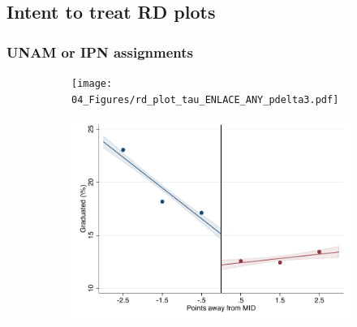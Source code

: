 \documentclass[oneside,11pt]{article}
\begin{document}
\subsection{Intent to treat RD plots}

\subsubsection{UNAM or IPN assignments}

\begin{figure}[H]

    \caption{RD plots for outcome variables across those assigned to either UNAM or IPN high-school, and those who are not\label{fig:ITT_rd_plot_elite_1}}
    \begin{center}
    
    \begin{subfigure}{0.475\textwidth}
        \centering
        \texttt{[image: 04\_Figures/rd\_plot\_tau\_ENLACE\_ANY\_pdelta3.pdf]}
    \end{subfigure}
    \begin{subfigure}{0.475\textwidth}
        \centering
        \includegraphics[width=\textwidth]{04_Figures/rd_plot_mid_ENLACE_ANY_pdelta3.pdf}
    \end{subfigure}


\end{center}
\end{figure}
\end{document}
